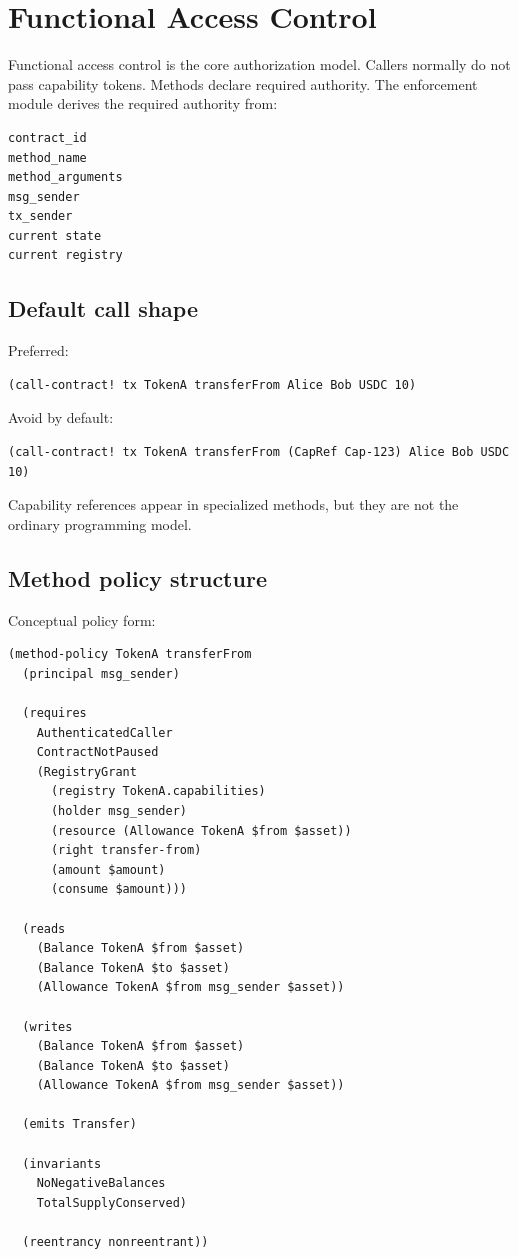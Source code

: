 \section{Functional Access Control}

Functional access control is the core \SCS{} authorization model. Callers normally do not pass capability tokens. Methods declare required authority. The enforcement module derives the required authority from:

\begin{lstlisting}
contract_id
method_name
method_arguments
msg_sender
tx_sender
current state
current registry
\end{lstlisting}

\subsection{Default call shape}

Preferred:

\begin{lstlisting}
(call-contract! tx TokenA transferFrom Alice Bob USDC 10)
\end{lstlisting}

Avoid by default:

\begin{lstlisting}
(call-contract! tx TokenA transferFrom (CapRef Cap-123) Alice Bob USDC 10)
\end{lstlisting}

Capability references \MAY{} appear in specialized methods, but they are not the ordinary programming model.

\subsection{Method policy structure}

Conceptual policy form:

\begin{lstlisting}
(method-policy TokenA transferFrom
  (principal msg_sender)

  (requires
    AuthenticatedCaller
    ContractNotPaused
    (RegistryGrant
      (registry TokenA.capabilities)
      (holder msg_sender)
      (resource (Allowance TokenA $from $asset))
      (right transfer-from)
      (amount $amount)
      (consume $amount)))

  (reads
    (Balance TokenA $from $asset)
    (Balance TokenA $to $asset)
    (Allowance TokenA $from msg_sender $asset))

  (writes
    (Balance TokenA $from $asset)
    (Balance TokenA $to $asset)
    (Allowance TokenA $from msg_sender $asset))

  (emits Transfer)

  (invariants
    NoNegativeBalances
    TotalSupplyConserved)

  (reentrancy nonreentrant))
\end{lstlisting}

